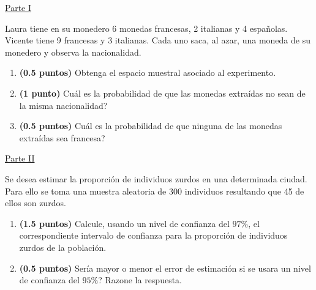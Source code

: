 
\noindent\underline{Parte I}

Laura tiene en su monedero 6 monedas francesas, 2 italianas y 4 españolas. Vicente tiene 9 francesas y 3 italianas. Cada uno saca, al azar, una moneda de su monedero y observa la nacionalidad.
\begin{enumerate}[label=\alph*)]
\item \textbf{(0.5 puntos)} Obtenga el espacio muestral asociado al experimento.
\item \textbf{(1 punto)} \textquestiondown{}Cuál es la probabilidad de que las monedas extraídas no sean de la misma nacionalidad?
\item \textbf{(0.5 puntos)} \textquestiondown{}Cuál es la probabilidad de que ninguna de las monedas extraídas sea francesa?
\end{enumerate}
\par\noindent\begin{minipage}{\linewidth}
\noindent\underline{Parte II}

Se desea estimar la proporción de individuos zurdos en una determinada ciudad. Para ello se toma una muestra aleatoria de 300 individuos resultando que 45 de ellos son zurdos.
\begin{enumerate}[label=\alph*)]
\item \textbf{(1.5 puntos)} Calcule, usando un nivel de confianza del $97\%$, el correspondiente intervalo de confianza para la proporción de individuos zurdos de la población.
\item \textbf{(0.5 puntos)} \textquestiondown{}Sería mayor o menor el error de estimación si se usara un nivel de confianza del $95\%$? Razone la respuesta.
\end{enumerate}
\end{minipage}\par
